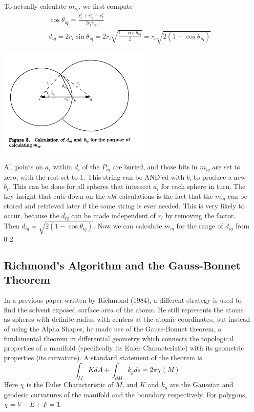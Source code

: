 \documentclass{article}
\begin{document}
To actually calculate $m_{iq}$, we first compute 
\begin{align}
&\cos\theta_{iq}=\frac{r_i^2+r_{iq}^2-r_q^2}{2r_ir_{iq}} \\
&d_{iq}=2r_i\sin\theta_{iq}=2r_i\sqrt{\frac{1-\cos\theta_{iq}}{2}}=r_i\sqrt{2(1-\cos\theta_{iq})}
\end{align}
\centerline{\includegraphics[width=3in]{mask}}
All points on $a_i$ within $d_i$ of the $P_{iq}$ are buried, and those bits in $m_{iq}$ are set to zero, with the rest set to 1. This string can be AND'ed with $b_i$ to produce a new $b_i$. This can be done for all spheres that intersect $a_i$ for each sphere in turn. The key insight that cuts down on the $nkl$ calculations is the fact that the $m_{iq}$ can be stored and retrieved later if the same string is ever needed. This is very likely to occur, because the $d_{iq}$ can be made independent of $r_i$ by removing the factor. Then $d_{iq}=\sqrt{2(1-\cos\theta_{iq})}$. Now we can calculate $m_{iq}$ for the range of $d_{iq}$ from 0-2.
\subsection{Richmond's Algorithm and the Gauss-Bonnet Theorem}
In a previous paper written by Richmond (1984), a different strategy is used to find the solvent exposed surface area of the atoms. He still represents the atoms as spheres with definite radius with centers at the atomic coordinates, but instead of using the Alpha Shapes, he made use of the Gauss-Bonnet theorem, a fundamental theorem in differential geometry which connects the topological properties of a manifold (specifically its Euler Characteristic) with its geometric properties (its curvature). A standard statement of the theorem is 
\begin{equation}
\int_M KdA + \int_{\partial M} k_g ds = 2\pi\chi(M)
\end{equation}
Here $\chi$ is the Euler Characteristic of $M$, and $K$ and $k_g$ are the Gaussian and geodesic curvatures of the manifold and the boundary respectively. For polygons, $\chi=V-E+F=1$. 
\end{document}
